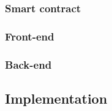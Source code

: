 \documentclass[12pt]{amsart}
\begin{document}
\begin{multicols}{2}


\vspace{0.35cm}

\subsubsection{Smart contract}
\subsubsection{Front-end} \label{ch:front-end}
\subsubsection{Back-end} \label{ch:back-end}

\subsection{Implementation} \label{ch:implementation}



\end{multicols}
\end{document}
